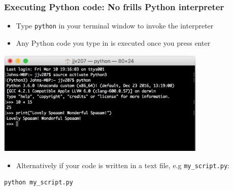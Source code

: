 \documentclass[pdf]{beamer}
\begin{document}
\begin{frame}[fragile]
\frametitle{Executing Python code: No frills Python interpreter}

\begin{itemize}\addtolength{\itemsep}{0.5\baselineskip}
	\item Type \texttt{python} in your terminal window to invoke the interpreter
	\item Any Python code you type in is executed once you press enter  
\end{itemize}

\centering
\includegraphics[width=0.75\textwidth]{python_interpreter.png}

\begin{itemize}\addtolength{\itemsep}{0.5\baselineskip}
	\item Alternatively if your code is written in a text file, e.g \texttt{my\_script.py}:
\end{itemize}

\begin{lstlisting}[style=bash]
python my_script.py
\end{lstlisting}

\end{frame}
\end{document}
